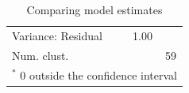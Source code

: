 \documentclass[10pt]{beamer}\usepackage[]{graphicx}\usepackage[]{color}
\begin{document}
\begin{frame}
\begin{table}
\begin{center}
\begin{scriptsize}
\begin{tabular}{l c c c }
Variance: Residual            &                                         & 1.00                                 &                                      \\
Num. clust.                   &                                         &                                      & 59                                   \\
\hline
\multicolumn{4}{l}{\tiny{$^*$ 0 outside the confidence interval}}
\end{tabular}
\end{scriptsize}
\caption{Comparing model estimates}
\label{table:coefficients}
\end{center}
\end{table}

\end{frame}
\end{document}
